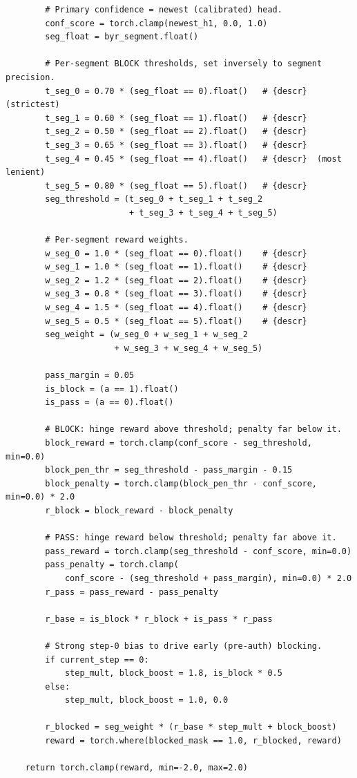 \documentclass[11pt]{article}
\begin{document}
\begin{lstlisting}
        # Primary confidence = newest (calibrated) head.
        conf_score = torch.clamp(newest_h1, 0.0, 1.0)
        seg_float = byr_segment.float()

        # Per-segment BLOCK thresholds, set inversely to segment precision.
        t_seg_0 = 0.70 * (seg_float == 0).float()   # {descr}  (strictest)
        t_seg_1 = 0.60 * (seg_float == 1).float()   # {descr}
        t_seg_2 = 0.50 * (seg_float == 2).float()   # {descr}
        t_seg_3 = 0.65 * (seg_float == 3).float()   # {descr}
        t_seg_4 = 0.45 * (seg_float == 4).float()   # {descr}  (most lenient)
        t_seg_5 = 0.80 * (seg_float == 5).float()   # {descr}
        seg_threshold = (t_seg_0 + t_seg_1 + t_seg_2
                         + t_seg_3 + t_seg_4 + t_seg_5)

        # Per-segment reward weights.
        w_seg_0 = 1.0 * (seg_float == 0).float()    # {descr}
        w_seg_1 = 1.0 * (seg_float == 1).float()    # {descr}
        w_seg_2 = 1.2 * (seg_float == 2).float()    # {descr}
        w_seg_3 = 0.8 * (seg_float == 3).float()    # {descr}
        w_seg_4 = 1.5 * (seg_float == 4).float()    # {descr}
        w_seg_5 = 0.5 * (seg_float == 5).float()    # {descr}
        seg_weight = (w_seg_0 + w_seg_1 + w_seg_2
                      + w_seg_3 + w_seg_4 + w_seg_5)

        pass_margin = 0.05
        is_block = (a == 1).float()
        is_pass = (a == 0).float()

        # BLOCK: hinge reward above threshold; penalty far below it.
        block_reward = torch.clamp(conf_score - seg_threshold, min=0.0)
        block_pen_thr = seg_threshold - pass_margin - 0.15
        block_penalty = torch.clamp(block_pen_thr - conf_score, min=0.0) * 2.0
        r_block = block_reward - block_penalty

        # PASS: hinge reward below threshold; penalty far above it.
        pass_reward = torch.clamp(seg_threshold - conf_score, min=0.0)
        pass_penalty = torch.clamp(
            conf_score - (seg_threshold + pass_margin), min=0.0) * 2.0
        r_pass = pass_reward - pass_penalty

        r_base = is_block * r_block + is_pass * r_pass

        # Strong step-0 bias to drive early (pre-auth) blocking.
        if current_step == 0:
            step_mult, block_boost = 1.8, is_block * 0.5
        else:
            step_mult, block_boost = 1.0, 0.0

        r_blocked = seg_weight * (r_base * step_mult + block_boost)
        reward = torch.where(blocked_mask == 1.0, r_blocked, reward)

    return torch.clamp(reward, min=-2.0, max=2.0)
\end{lstlisting}
\end{document}

